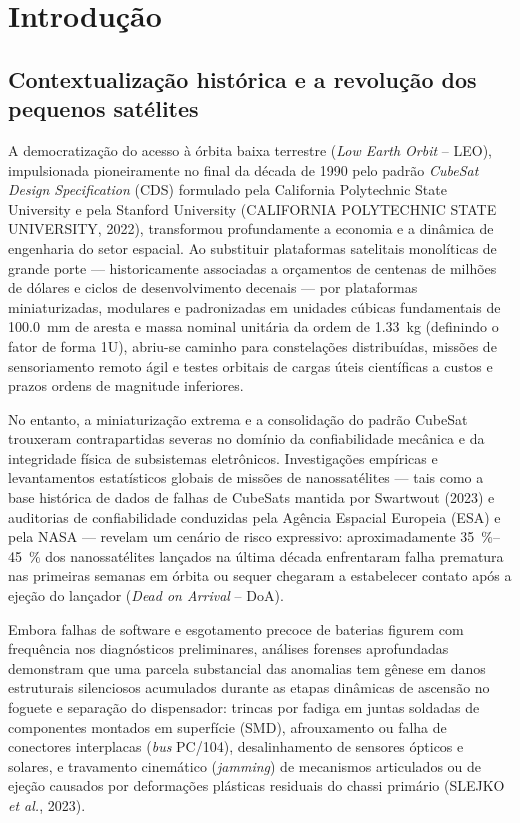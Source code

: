 \chapter{Introdução}
\label{cap:introducao}

\section{Contextualização histórica e a revolução dos pequenos satélites}
\label{sec:intro-contexto}

A democratização do acesso à órbita baixa terrestre (\textit{Low Earth Orbit} -- LEO), impulsionada pioneiramente no final da década de 1990 pelo padrão \textit{CubeSat Design Specification} (CDS) formulado pela California Polytechnic State University e pela Stanford University (CALIFORNIA POLYTECHNIC STATE UNIVERSITY, 2022), transformou profundamente a economia e a dinâmica de engenharia do setor espacial. Ao substituir plataformas satelitais monolíticas de grande porte — historicamente associadas a orçamentos de centenas de milhões de dólares e ciclos de desenvolvimento decenais — por plataformas miniaturizadas, modulares e padronizadas em unidades cúbicas fundamentais de \SI{100.0}{\milli\metre} de aresta e massa nominal unitária da ordem de \SI{1.33}{\kilo\gram} (definindo o fator de forma 1U), abriu-se caminho para constelações distribuídas, missões de sensoriamento remoto ágil e testes orbitais de cargas úteis científicas a custos e prazos ordens de magnitude inferiores.

No entanto, a miniaturização extrema e a consolidação do padrão CubeSat trouxeram contrapartidas severas no domínio da confiabilidade mecânica e da integridade física de subsistemas eletrônicos. Investigações empíricas e levantamentos estatísticos globais de missões de nanossatélites — tais como a base histórica de dados de falhas de CubeSats mantida por Swartwout (2023) e auditorias de confiabilidade conduzidas pela Agência Espacial Europeia (ESA) e pela NASA — revelam um cenário de risco expressivo: aproximadamente \SIrange{35}{45}{\percent} dos nanossatélites lançados na última década enfrentaram falha prematura nas primeiras semanas em órbita ou sequer chegaram a estabelecer contato após a ejeção do lançador (\textit{Dead on Arrival} -- DoA). 

Embora falhas de software e esgotamento precoce de baterias figurem com frequência nos diagnósticos preliminares, análises forenses aprofundadas demonstram que uma parcela substancial das anomalias tem gênese em danos estruturais silenciosos acumulados durante as etapas dinâmicas de ascensão no foguete e separação do dispensador: trincas por fadiga em juntas soldadas de componentes montados em superfície (SMD), afrouxamento ou falha de conectores interplacas (\textit{bus} PC/104), desalinhamento de sensores ópticos e solares, e travamento cinemático (\textit{jamming}) de mecanismos articulados ou de ejeção causados por deformações plásticas residuais do chassi primário (SLEJKO \textit{et al.}, 2023).

